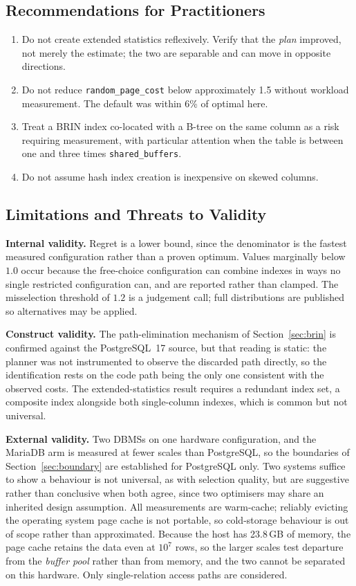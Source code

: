 \documentclass[12pt, a4paper]{article}
\newcommand{\rpc}{\texttt{random\_page\_cost}}
\newcommand{\sbuf}{\texttt{shared\_buffers}}
\begin{document}
\subsection{Recommendations for Practitioners}

\begin{enumerate}[nosep]
\item Do not create extended statistics reflexively. Verify that the
  \emph{plan} improved, not merely the estimate; the two are separable
  and can move in opposite directions.
\item Do not reduce \rpc{} below approximately 1.5 without workload
  measurement. The default was within 6\% of optimal here.
\item Treat a BRIN index co-located with a B-tree on the same column as
  a risk requiring measurement, with particular attention when the table
  is between one and three times \sbuf{}.
\item Do not assume hash index creation is inexpensive on skewed
  columns.
\end{enumerate}

\subsection{Limitations and Threats to Validity}

\textbf{Internal validity.} Regret is a lower bound, since the
denominator is the fastest measured configuration rather than a proven
optimum. Values marginally below $1.0$ occur because the free-choice
configuration can combine indexes in ways no single restricted
configuration can, and are reported rather than clamped. The
misselection threshold of $1.2$ is a judgement call; full distributions
are published so alternatives may be applied.

\textbf{Construct validity.} The path-elimination mechanism of
Section~\ref{sec:brin} is confirmed against the PostgreSQL~17 source,
but that reading is static: the planner was not instrumented to observe
the discarded path directly, so the identification rests on the code
path being the only one consistent with the observed costs. The
extended-statistics result requires a redundant index set, a composite
index alongside both single-column indexes, which is common but not
universal.

\textbf{External validity.} Two DBMSs on one hardware configuration, and
the MariaDB arm is measured at fewer scales than PostgreSQL, so the
boundaries of Section~\ref{sec:boundary} are established for PostgreSQL
only. Two systems suffice to show a behaviour is not universal, as with
selection quality, but are suggestive rather than conclusive when both
agree, since two optimisers may share an inherited design assumption. All
measurements are warm-cache; reliably evicting the operating system page
cache is not portable, so cold-storage behaviour is out of scope rather
than approximated. Because the host has 23.8\,GB of memory, the page
cache retains the data even at $10^7$ rows, so the larger scales test
departure from the \emph{buffer pool} rather than from memory, and the
two cannot be separated on this hardware. Only single-relation access
paths are considered.
\end{document}
